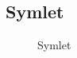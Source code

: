 \pagebreak
\subsection{Symlet}

\begin{figure}[!htb]\centering
    \begin{minipage}{0.8\textwidth}
        \caption{\small{Symlet}}
    \end{minipage}
\end{figure}

